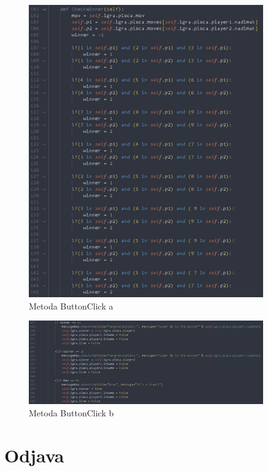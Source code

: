 \documentclass[]{foi} %
\begin{document}
\begin{figure}[]
    \centering
    \includegraphics[width=0.9\textwidth]{slike/impl_10.png}
    \caption{Metoda ButtonClick a \cite{Vlastita izrada}}
    \label{fig:podjela}
\end{figure}


\begin{figure}[]
    \centering
    \includegraphics[width=0.9\textwidth]{slike/impl_11.png}
    \caption{Metoda ButtonClick b \cite{Vlastita izrada}}
    \label{fig:podjela}
\end{figure}


\section{Odjava}
\end{document}
